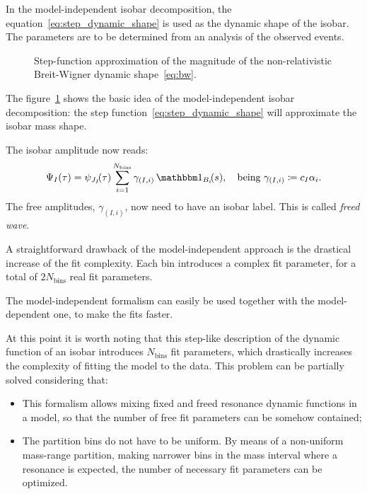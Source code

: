     In the model-independent isobar decomposition, the equation~\eqref{eq:step_dynamic_shape} is used as the dynamic shape of the isobar.
    The parameters are to be determined from an analysis of the observed events.
    \begin{figure}
        \centering
        
        \caption{Step-function approximation of the magnitude of the non-relativistic Breit-Wigner dynamic shape~\eqref{eq:bw}.}
        \label{fig:step_function_approximation}
    \end{figure}
    The figure~\ref{fig:step_function_approximation} shows the basic idea of the model-independent isobar decomposition: the step function~\eqref{eq:step_dynamic_shape} will approximate the isobar mass shape.


    The isobar amplitude now reads:
    \begin{equation}
        \Psi_I(\tau) = \psi_{J_I}\!(\tau) \sum_{i=1}^{N_\text{bins}} \gamma_{(I,i)}\, \Characteristic_{B_i}\!(s),
        \quad
        \text{being }
        \gamma_{(I,i)} \coloneqq c_I \alpha_i. 
    \end{equation}
    The free amplitudes, $\gamma_{(I,i)}$, now need to have an isobar label.
    This is called \emph{freed wave}.


    A straightforward drawback of the model-independent approach is the drastical increase of the fit complexity.
    Each bin introduces a complex fit parameter, for a total of $2N_{\text{bins}}$ real fit parameters.


    The model-independent formalism can easily be used together with the model-dependent one, to make the fits faster.

    At this point it is worth noting that this step-like description of the dynamic function of an isobar introduces $N_\text{bins}$ fit parameters, which drastically increases the complexity of fitting the model to the data.
    This problem can be partially solved considering that:
    \begin{itemize}
        \item 
            This formalism allows mixing fixed and freed resonance dynamic functions in a model, so that the number of free fit parameters can be somehow contained;
        \item
            The partition bins do not have to be uniform. By means of a non-uniform mass-range partition, making narrower bins in the mass interval where a resonance is expected, the number of necessary fit parameters can be optimized.
    \end{itemize}


